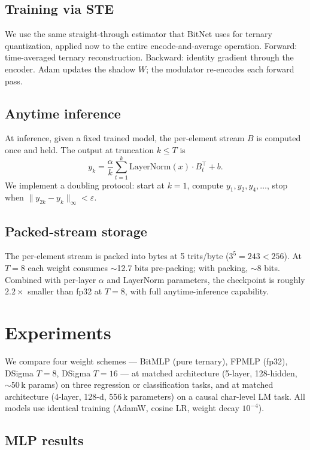 \documentclass[11pt]{article}
\begin{document}
\subsection{Training via STE}

We use the same straight-through estimator that BitNet uses for
ternary quantization, applied now to the entire encode-and-average
operation. Forward: time-averaged ternary reconstruction. Backward:
identity gradient through the encoder. Adam updates the shadow $W$;
the modulator re-encodes each forward pass.

\subsection{Anytime inference}

At inference, given a fixed trained model, the per-element stream $B$
is computed once and held. The output at truncation $k \le T$ is
\begin{equation*}
y_k = \frac{\alpha}{k} \sum_{t=1}^{k} \text{LayerNorm}(x) \cdot B_t^\top + b.
\end{equation*}
We implement a doubling protocol: start at $k=1$, compute
$y_1, y_2, y_4, \ldots$, stop when
$\|y_{2k} - y_k\|_\infty < \varepsilon$.

\subsection{Packed-stream storage}

The per-element stream is packed into bytes at 5 trits/byte
($3^5 = 243 < 256$). At $T=8$ each weight consumes $\sim$12.7 bits
pre-packing; with packing, $\sim$8 bits. Combined with per-layer
$\alpha$ and LayerNorm parameters, the checkpoint is roughly
$2.2\times$ smaller than fp32 at $T=8$, with full anytime-inference
capability.

\section{Experiments}

We compare four weight schemes --- BitMLP (pure ternary), FPMLP (fp32),
DSigma $T=8$, DSigma $T=16$ --- at matched architecture
(5-layer, 128-hidden, ${\sim}50$\,k params) on three regression
or classification tasks, and at matched architecture (4-layer, 128-d,
556\,k parameters) on a causal char-level LM task. All models use
identical training (AdamW, cosine LR, weight decay $10^{-4}$).

\subsection{MLP results}
\end{document}
